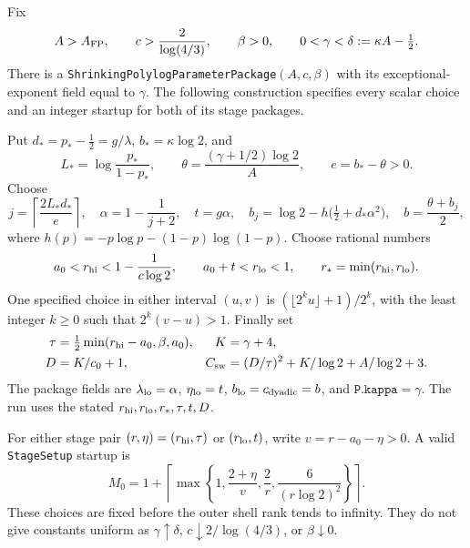 \begin{proposition}
\label{prop:Shaik-prescribed-rate}
Fix
\[
 A>A_{\rm FP},\qquad c>\frac{2}{\log(4/3)},\qquad \beta>0,\qquad
 0<\gamma<\delta:=\kappa A-\tfrac12.
\]
There is a \texttt{ShrinkingPolylogParameterPackage}\((A,c,\beta)\)
with its exceptional-exponent field equal to \(\gamma\).
The following construction specifies every scalar choice and an
integer startup for both of its stage packages.

Put \(d_*=p_*-\tfrac12=g/\lambda\),
\(b_*=\kappa\log2\), and
\[
 L_*=\log\frac{p_*}{1-p_*},\qquad
 \theta=\frac{(\gamma+1/2)\log2}{A},\qquad e=b_*-\theta>0.
\]
Choose
\begin{equation}\label{eq:Shaik-effective-barrier}
 j=\left\lceil\frac{2L_*d_*}{e}\right\rceil,\quad
 \alpha=1-\frac1{j+2},\quad t=g\alpha,\quad
 b_j=\log2-h\bigl(\tfrac12+d_*\alpha^2\bigr),\quad
 b=\frac{\theta+b_j}{2},
\end{equation}
where \(h(p)=-p\log p-(1-p)\log(1-p)\).
Choose rational numbers
\[
 a_0<r_{\rm hi}<1-\frac1{c\log2},\qquad
 a_0+t<r_{\rm lo}<1,\qquad r_*=\min(r_{\rm hi},r_{\rm lo}).
\]
One specified choice in either interval \((u,v)\) is
\((\lfloor2^k u\rfloor+1)/2^k\), with the least integer \(k\ge0\)
such that \(2^k(v-u)>1\).
Finally set
\begin{equation}\label{eq:Shaik-prescribed-high}
 \begin{aligned}
 \tau&=\tfrac12\min(r_{\rm hi}-a_0,\beta,a_0),&
 K&=\gamma+4,\\
 D&=K/c_0+1,&
 C_{\rm sw}&=(D/\tau)^2+K/\log2+A/\log2+3 .
 \end{aligned}
\end{equation}
The package fields are
\(\lambda_{\rm lo}=\alpha\), \(\eta_{\rm lo}=t\),
\(b_{\rm lo}=c_{\rm dyadic}=b\), and
\(\texttt{P.kappa}=\gamma\).
The run uses the stated \(r_{\rm hi},r_{\rm lo},r_*,\tau,t,D\).

For either stage pair \((r,\eta)=(r_{\rm hi},\tau)\) or
\((r_{\rm lo},t)\), write \(v=r-a_0-\eta>0\).
A valid \texttt{StageSetup} startup is
\begin{equation}\label{eq:Shaik-explicit-startup}
 M_0=1+\left\lceil\max\left\{
 1,\frac{2+\eta}{v},\frac2r,\frac6{(r\log2)^2}
 \right\}\right\rceil .
\end{equation}
These choices are fixed before the outer shell rank tends to infinity.
They do not give constants uniform as \(\gamma\uparrow\delta\),
\(c\downarrow2/\log(4/3)\), or \(\beta\downarrow0\).
\end{proposition}
